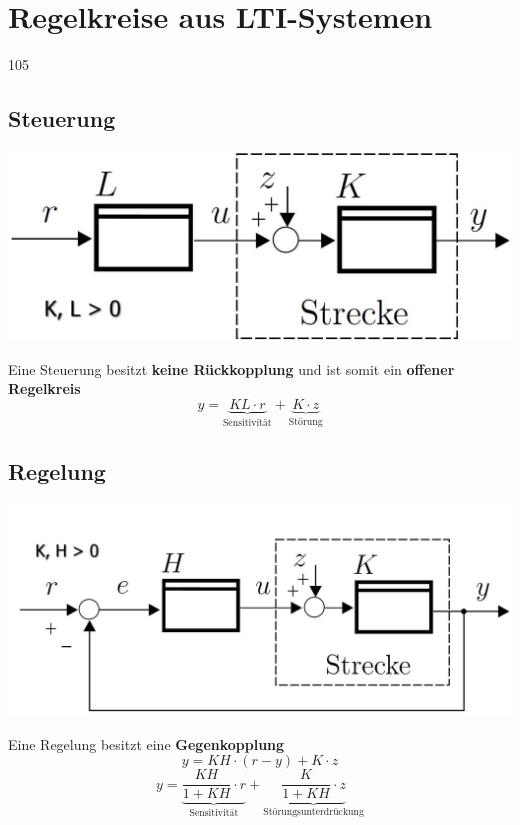 \section{Regelkreise aus LTI-Systemen}{105}

\subsection{Steuerung} 
    
    \begin{minipage}[c]{0.48\columnwidth}
        \includegraphics[align=center, width=\columnwidth]{images/steuerung.jpg}
    \end{minipage}
    \hfill
    \begin{minipage}[c]{0.5\columnwidth}
        Eine Steuerung besitzt \textbf{keine Rückkopplung} und ist somit ein \textbf{offener Regelkreis}
        $$ y = \underbrace{K L \cdot r}_{\text{Sensitivität}} + \underbrace{K \cdot z}_{\text{Störung}}$$
    \end{minipage}


\subsection{Regelung}

    \begin{minipage}[c]{0.48\columnwidth}
        \includegraphics[align=center, width=\columnwidth]{images/regelung.jpg}
    \end{minipage}
    \hfill
    \begin{minipage}[c]{0.5\columnwidth}
        Eine Regelung besitzt eine \textbf{Gegenkopplung}
        $$ y = K H \cdot (r - y) + K \cdot z$$
        $$ y = \underbrace{\frac{K H}{1 + K H} \cdot r}_{\text{Sensitivität}} + \underbrace{\frac{K}{1 + K H} \cdot z}_{\text{Störungsunterdrückung}} $$
    \end{minipage}


